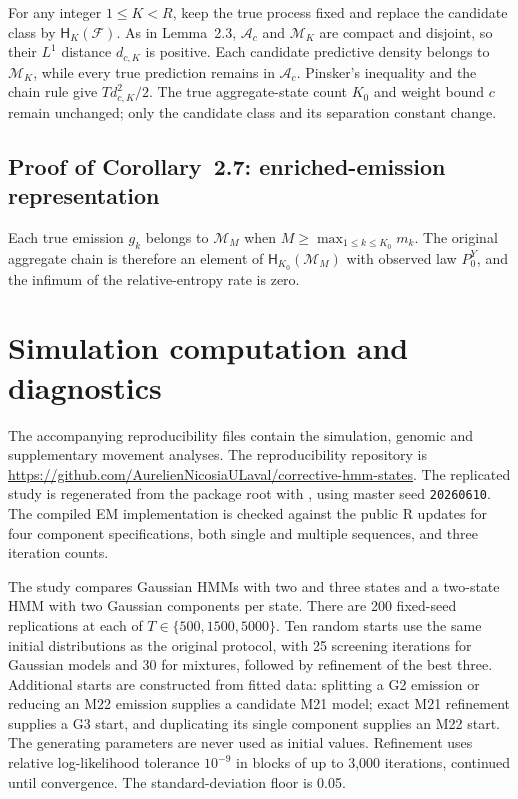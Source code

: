 \documentclass[11pt]{article}
\newcommand{\Fcal}{\mathcal{F}}
\newcommand{\Mcal}{\mathcal{M}}
\newcommand{\Acal}{\mathcal{A}}
\newcommand{\Hcal}{\mathsf{H}}
\begin{document}
For any integer $1\leq K<R$, keep the true process fixed and replace the
candidate class by $\Hcal_K(\Fcal)$. As in Lemma~2.3, $\Acal_c$ and
$\Mcal_K$ are compact and disjoint, so their $L^1$ distance $d_{c,K}$ is
positive. Each candidate predictive density belongs to $\Mcal_K$, while
every true prediction remains in $\Acal_c$. Pinsker's inequality and the
chain rule give $T d_{c,K}^2/2$. The true aggregate-state count $K_0$ and
weight bound $c$ remain unchanged; only the candidate class and its
separation constant change.

\subsection{Proof of Corollary~2.7: enriched-emission representation}

Each true emission $g_k$ belongs to $\Mcal_M$ when
$M\geq\max_{1\leq k\leq K_0}m_k$. The original aggregate chain is therefore an
element of
$\Hcal_{K_0}(\Mcal_M)$ with observed law $P_0^Y$, and the infimum of the
relative-entropy rate is zero.

\section{Simulation computation and diagnostics}\label{sec:simulation-si}

The accompanying reproducibility files contain the simulation, genomic and
supplementary movement analyses. The reproducibility repository is
\url{https://github.com/AurelienNicosiaULaval/corrective-hmm-states}.
The replicated study is regenerated from the package root with
, using master seed
\texttt{20260610}. The compiled EM implementation is checked against the
public R updates for four component specifications, both single and multiple
sequences, and three iteration counts.

The study compares Gaussian HMMs with two and three states and a two-state
HMM with two Gaussian components per state. There are 200 fixed-seed
replications at each of $T\in\{500,1500,5000\}$. Ten random starts use the
same initial distributions as the original protocol, with 25 screening
iterations for Gaussian models and 30 for mixtures, followed by refinement
of the best three. Additional starts are constructed from fitted data:
splitting a G2 emission or reducing an M22 emission supplies a candidate
M21 model; exact M21 refinement supplies a G3 start, and duplicating its
single component supplies an M22 start. The generating parameters are
never used as initial values. Refinement uses relative log-likelihood
tolerance $10^{-9}$ in blocks of up to 3,000 iterations, continued until
convergence. The standard-deviation floor is 0.05.
\end{document}
